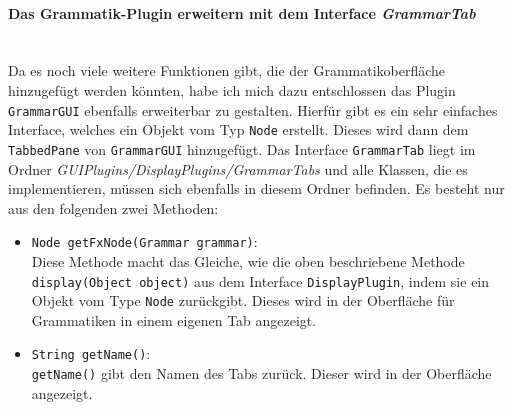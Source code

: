 \paragraph{Das Grammatik-Plugin erweitern mit dem Interface \textit{GrammarTab}}\ \\
Da es noch viele weitere Funktionen gibt, die der Grammatikoberfläche hinzugefügt werden könnten, habe ich mich dazu entschlossen das Plugin \lstinline[columns=fixed]{GrammarGUI} ebenfalls erweiterbar zu gestalten. Hierfür gibt es ein sehr einfaches Interface, welches ein Objekt vom Typ \lstinline[columns=fixed]{Node} erstellt. Dieses wird dann dem \lstinline[columns=fixed]{TabbedPane} von \lstinline[columns=fixed]{GrammarGUI} hinzugefügt. Das Interface \lstinline[columns=fixed]{GrammarTab} liegt im Ordner \textit{GUIPlugins/DisplayPlugins/GrammarTabs} und alle Klassen, die es implementieren, müssen sich ebenfalls in diesem Ordner befinden. Es besteht nur aus den folgenden zwei Methoden:
\begin{itemize}
	\item \lstinline[columns=fixed]{Node getFxNode(Grammar grammar)}:\\
	Diese Methode macht das Gleiche, wie die oben beschriebene Methode \lstinline[columns=fixed]{display(Object object)} aus dem Interface \lstinline[columns=fixed]{DisplayPlugin}, indem sie ein Objekt vom Type \lstinline[columns=fixed]{Node} zurückgibt. Dieses wird in der Oberfläche für Grammatiken in einem eigenen Tab angezeigt.
	\item \lstinline[columns=fixed]{String getName()}:\\
	\lstinline[columns=fixed]{getName()} gibt den Namen des Tabs zurück. Dieser wird in der Oberfläche angezeigt.
\end{itemize}
